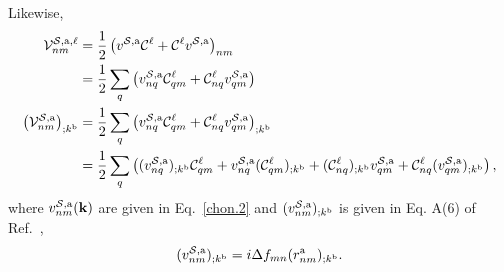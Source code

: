 Likewise,
\begin{align}\label{a.3b}
{\mathbf{\cal V}}^{{\cal S},\mathrm{a},\ell}_{nm}
&=
\frac{1}{2}\left(  
v^{{\cal S},\mathrm{a}}{\mathbf{\cal C}}^\ell+{\mathbf{\cal C}}^\ell v^{{\cal S},\mathrm{a}}
\right)_{nm}
\nonumber\\
&=
\frac{1}{2}\sum_q\left(  
v^{{\cal S},\mathrm{a}}_{nq}{\mathbf{\cal C}}^\ell_{qm}+{\mathbf{\cal C}}^\ell_{nq} v^{{\cal S},\mathrm{a}}_{qm}
\right)
\nonumber\\
\left({\mathbf{\cal V}}^{{\cal S},\mathrm{a}}_{nm}\right)_{;k^{\mathrm{b}}}
&=
\frac{1}{2}\sum_q\left(  
v^{{\cal S},\mathrm{a}}_{nq}{\mathbf{\cal C}}^\ell_{qm}+{\mathbf{\cal C}}^\ell_{nq} v^{{\cal S},\mathrm{a}}_{qm}
\right) _{;k^{\mathrm{b}}}
\nonumber\\
&=
\frac{1}{2}\sum_q\left(
(v^{{\cal S},\mathrm{a}}_{nq})_{;k^{\mathrm{b}}}{\mathbf{\cal C}}^\ell_{qm}
+   
v^{{\cal S},\mathrm{a}}_{nq}({\mathbf{\cal C}}^\ell_{qm})_{;k^{\mathrm{b}}}
+
({\mathbf{\cal C}}^\ell_{nq})_{;k^{\mathrm{b}}} v^{{\cal S},\mathrm{a}}_{qm}
+
{\mathbf{\cal C}}^\ell_{nq} (v^{{\cal S},\mathrm{a}}_{qm})_{;k^{\mathrm{b}}}
\right)
,
\end{align}   
where $v^{{\cal S},\mathrm{a}}_{nm}(\mathbf{k})$ are given in Eq.~\eqref{chon.2}
and
$(v^{{\cal S},\mathrm{a}}_{nm})_{;k^{\mathrm{b}}}$ is given in Eq. A(6) of
Ref.~,
\begin{align}\label{choni.1}
(v^{{\cal S},\mathrm{a}}_{nm})_{;k^{\mathrm{b}}}=i\Delta f_{mn}
(r^{\mathrm{a}}_{nm})_{;k^{\mathrm{b}}}
.
\end{align}

